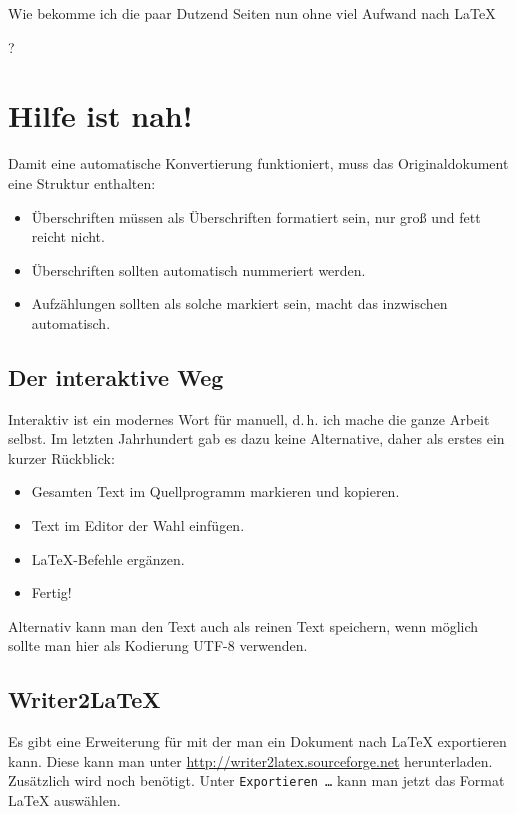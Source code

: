 Wie bekomme ich die paar Dutzend Seiten nun ohne viel Aufwand nach \LaTeX{{}?

\section{Hilfe ist nah!}

Damit eine automatische Konvertierung funktioniert, muss das Originaldokument eine Struktur enthalten:

\begin{itemize}
\item Überschriften müssen als Überschriften formatiert sein, nur groß und fett reicht nicht.
\item Überschriften sollten automatisch nummeriert werden.
\item Aufzählungen sollten als solche markiert sein,  macht das inzwischen automatisch.
\end{itemize}

\subsection{Der interaktive Weg}

Interaktiv ist ein modernes Wort für manuell, d.\,h. ich mache die ganze Arbeit selbst. 
Im letzten Jahrhundert gab es dazu keine Alternative, daher als erstes ein kurzer Rückblick:

\begin{itemize}
\item Gesamten Text im Quellprogramm markieren und kopieren.
\item Text im Editor der Wahl einfügen.
\item \LaTeX{}-Befehle ergänzen.
\item Fertig!
\end{itemize}

Alternativ kann man den Text auch als reinen Text speichern, wenn möglich sollte man hier als Kodierung UTF-8 verwenden.

\subsection{Writer2LaTeX}

Es gibt eine Erweiterung für  mit der man ein Dokument nach \LaTeX{} exportieren kann.
Diese kann man unter \url{http://writer2latex.sourceforge.net} herunterladen.
Zusätzlich wird noch  benötigt.
Unter \texttt{Exportieren \dots} kann man jetzt das Format \LaTeX{} auswählen.

}
